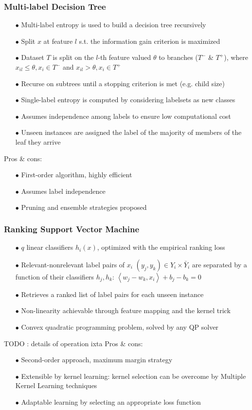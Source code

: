 \documentclass{beamer}
\begin{document}
\begin{frame}
\frametitle{Multi-label Decision Tree}
\begin{itemize}
\item[$\bullet$] Multi-label entropy is used to build a decision tree recursively
\item[$\bullet$] Split $x$ at feature $l$ s.t. the information gain criterion is maximized
\item[$\bullet$] Dataset $T$ is split on the $l$-th feature valued $\theta$ to branches ($T^-$ \& $T^+$), where $ x_{il} \leq \theta, x_i \in T^-$ and $ x_{il} > \theta, x_i \in T^+$
\item[$\bullet$] Recurse on subtrees until a stopping criterion is met (e.g. child size)
\item[$\bullet$] Single-label entropy is computed by considering labelsets as new classes
\item[$\bullet$] Assumes independence among labels to ensure low computational cost
\item[$\bullet$] Unseen instances are assigned the label of the majority of members of the leaf they arrive
\end{itemize}
Pros \& cons:
\begin{itemize}
\item[$\bullet$] First-order algorithm, highly efficient
\item[$\bullet$] Assumes label independence
\item[$\bullet$] Pruning and ensemble strategies proposed
\end{itemize}
\end{frame}
\begin{frame}
\frametitle{Ranking Support Vector Machine}
\begin{itemize}
	\item[$\bullet$] $q$ linear classifiers $h_i(x)$, optimized with the empirical ranking loss
\item[$\bullet$] Relevant-nonrelevant label pairs of $x_i$ $(y_j,y_k) \in Y_i \times \bar Y_i$ are separated by a function of their classifiers $h_j, h_k$: $\left<w_j-w_k, x_i \right> + b_j - b_k=0$
\item[$\bullet$] Retrieves a ranked list of label pairs for each unseen instance
\item[$\bullet$] Non-linearity achievable through feature mapping and the kernel trick
\item[$\bullet$] Convex quadratic programming problem, solved by any QP solver
\end{itemize}
TODO : details of operation ixta
Pros \& cons:
\begin{itemize}
\item[$\bullet$] Second-order approach, maximum margin strategy
\item[$\bullet$] Extensible by kernel learning: kernel selection can be overcome by Multiple Kernel Learning techniques
\item[$\bullet$] Adaptable learning by selecting an appropriate loss function
\end{itemize}

\end{frame}
\end{document}
